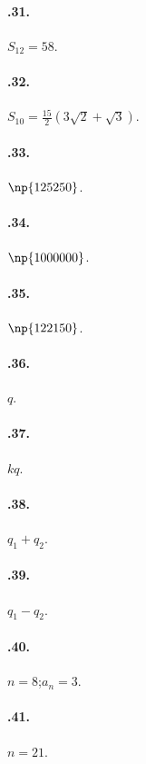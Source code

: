 \begin{multicols}{2}
\paragraph{\thechapter.31.} $S_{12}=58$.

\paragraph{\thechapter.32.} $S_{10}=\frac{15}{2}\left(3\sqrt{2}+\sqrt{3}\right)$.

\paragraph{\thechapter.33.} $\np{125250}$.

\paragraph{\thechapter.34.} $\np{1000000}$.

\paragraph{\thechapter.35.} $\np{122150}$.

\paragraph{\thechapter.36.} $q$.

\paragraph{\thechapter.37.} $kq$.

\paragraph{\thechapter.38.} $q_1+q_2$.

\paragraph{\thechapter.39.} $q_1-q_2$.

\paragraph{\thechapter.40.} $n=8$;\quad $a_n=3$.

\paragraph{\thechapter.41.} $n=21$.


\end{multicols}
